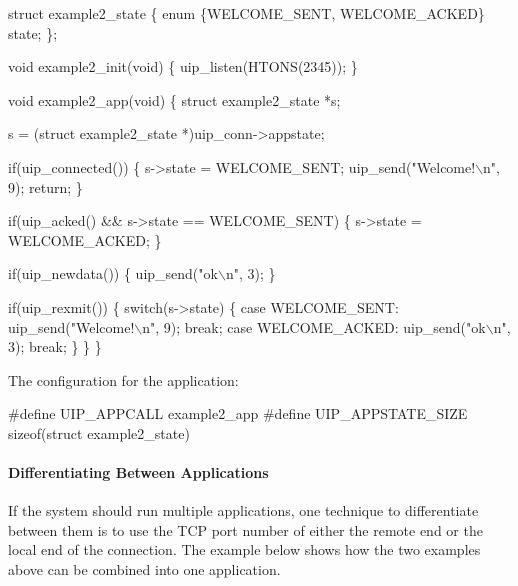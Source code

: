 \begin{DoxyCode}
\textcolor{keyword}{struct }example2\_state \{
   \textcolor{keyword}{enum} \{WELCOME\_SENT, WELCOME\_ACKED\} state;
\};

\textcolor{keywordtype}{void} example2\_init(\textcolor{keywordtype}{void}) \{
   uip\_listen(HTONS(2345));
\}

\textcolor{keywordtype}{void} example2\_app(\textcolor{keywordtype}{void}) \{
   \textcolor{keyword}{struct }example2\_state *s;

   s = (\textcolor{keyword}{struct }example2\_state *)uip\_conn->appstate;
   
   \textcolor{keywordflow}{if}(uip\_connected()) \{
      s->state = WELCOME\_SENT;
      uip\_send(\textcolor{stringliteral}{"Welcome!\(\backslash\)n"}, 9);
      \textcolor{keywordflow}{return};
   \} 

   \textcolor{keywordflow}{if}(uip\_acked() && s->state == WELCOME\_SENT) \{
      s->state = WELCOME\_ACKED;
   \}

   \textcolor{keywordflow}{if}(uip\_newdata()) \{
      uip\_send(\textcolor{stringliteral}{"ok\(\backslash\)n"}, 3);
   \}

   \textcolor{keywordflow}{if}(uip\_rexmit()) \{
      \textcolor{keywordflow}{switch}(s->state) \{
      \textcolor{keywordflow}{case} WELCOME\_SENT:
         uip\_send(\textcolor{stringliteral}{"Welcome!\(\backslash\)n"}, 9);
         \textcolor{keywordflow}{break};
      \textcolor{keywordflow}{case} WELCOME\_ACKED:
         uip\_send(\textcolor{stringliteral}{"ok\(\backslash\)n"}, 3);
         \textcolor{keywordflow}{break};
      \}
   \}
\}
\end{DoxyCode}


The configuration for the application\+:


\begin{DoxyCode}
\textcolor{preprocessor}{#define UIP\_APPCALL       example2\_app}
\textcolor{preprocessor}{#define UIP\_APPSTATE\_SIZE sizeof(struct example2\_state)}
\end{DoxyCode}
\hypertarget{a00074_example3}{}\paragraph{Differentiating Between Applications}\label{a00074_example3}
If the system should run multiple applications, one technique to differentiate between them is to use the T\+CP port number of either the remote end or the local end of the connection. The example below shows how the two examples above can be combined into one application.


